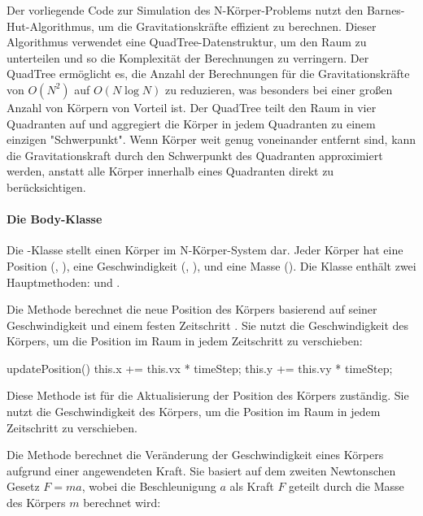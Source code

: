 \documentclass[a4paper,12pt,twoside]{article}
\begin{document}
Der vorliegende Code zur Simulation des N-Körper-Problems nutzt den Barnes-Hut-Algorithmus, um die Gravitationskräfte effizient zu berechnen. Dieser Algorithmus verwendet eine QuadTree-Datenstruktur, um den Raum zu unterteilen und so die Komplexität der Berechnungen zu verringern. Der QuadTree ermöglicht es, die Anzahl der Berechnungen für die Gravitationskräfte von \(O(N^2)\) auf \(O(N \log N)\) zu reduzieren, was besonders bei einer großen Anzahl von Körpern von Vorteil ist. Der QuadTree teilt den Raum in vier Quadranten auf und aggregiert die Körper in jedem Quadranten zu einem einzigen "Schwerpunkt". Wenn Körper weit genug voneinander entfernt sind, kann die Gravitationskraft durch den Schwerpunkt des Quadranten approximiert werden, anstatt alle Körper innerhalb eines Quadranten direkt zu berücksichtigen.

\paragraph{Die Body-Klasse}
Die -Klasse stellt einen Körper im N-Körper-System dar. Jeder Körper hat eine Position (, ), eine Geschwindigkeit (, ), und eine Masse (). Die Klasse enthält zwei Hauptmethoden:  und .

Die Methode  berechnet die neue Position des Körpers basierend auf seiner Geschwindigkeit und einem festen Zeitschritt . Sie nutzt die Geschwindigkeit des Körpers, um die Position im Raum in jedem Zeitschritt zu verschieben:

\begin{javascript}
updatePosition() {
    this.x += this.vx * timeStep;
    this.y += this.vy * timeStep;
}
\end{javascript}

Diese Methode ist für die Aktualisierung der Position des Körpers zuständig. Sie nutzt die Geschwindigkeit des Körpers, um die Position im Raum in jedem Zeitschritt zu verschieben.

Die Methode  berechnet die Veränderung der Geschwindigkeit eines Körpers aufgrund einer angewendeten Kraft. Sie basiert auf dem zweiten Newtonschen Gesetz \(F = ma\), wobei die Beschleunigung \(a\) als Kraft \(F\) geteilt durch die Masse des Körpers \(m\) berechnet wird:
\end{document}
